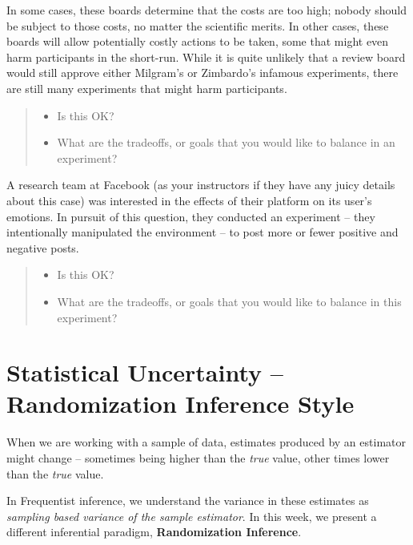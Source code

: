 \documentclass[
]{book}
\providecommand{\tightlist}{%
  \setlength{\itemsep}{0pt}\setlength{\parskip}{0pt}}
\begin{document}
In some cases, these boards determine that the costs are too high;
nobody should be subject to those costs, no matter the scientific
merits. In other cases, these boards will allow potentially costly
actions to be taken, some that might even harm participants in the
short-run. While it is quite unlikely that a review board would still
approve either Milgram's or Zimbardo's infamous experiments, there are
still many experiments that might harm participants.

\begin{quote}
\begin{itemize}
\tightlist
\item
  Is this OK?
\item
  What are the tradeoffs, or goals that you would like to balance in an
  experiment?
\end{itemize}
\end{quote}

A research team at Facebook (as your instructors if they have any juicy
details about this case) was interested in the effects of their platform
on its user's emotions. In pursuit of this question, they conducted an
experiment -- they intentionally manipulated the environment -- to post
more or fewer positive and negative posts.

\begin{quote}
\begin{itemize}
\tightlist
\item
  Is this OK?
\item
  What are the tradeoffs, or goals that you would like to balance in
  this experiment?
\end{itemize}
\end{quote}

\hypertarget{statistical-uncertainty-randomization-inference-style}{%
\section{Statistical Uncertainty -- Randomization Inference
Style}\label{statistical-uncertainty-randomization-inference-style}}

When we are working with a sample of data, estimates produced by an
estimator might change -- sometimes being higher than the \emph{true}
value, other times lower than the \emph{true} value.

In Frequentist inference, we understand the variance in these estimates
as \emph{sampling based variance of the sample estimator}. In this week,
we present a different inferential paradigm, \textbf{Randomization
Inference}.
\end{document}
